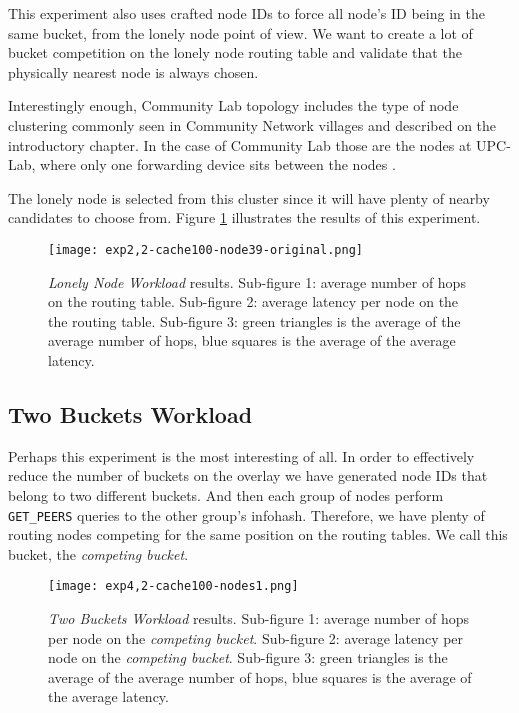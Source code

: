 \documentclass[conference]{IEEEtran}
\begin{document}
This experiment also uses crafted node IDs to force all node's ID being in the same bucket, from the lonely node point of view. We want to create a lot of bucket competition on the lonely node routing table and validate that the physically nearest node is always chosen.

Interestingly enough, Community Lab topology includes the type of node clustering commonly seen in Community Network villages and described on the introductory chapter. In the case of Community Lab those are the nodes at UPC-Lab, where only one forwarding device sits between the nodes \cite{b19}.

The lonely node is selected from this cluster since it will have plenty of nearby candidates to choose from. Figure \ref{fig:exp2,2-cache100-node39-original} illustrates the results of this experiment.

\begin{figure}
    \texttt{[image: exp2,2-cache100-node39-original.png]}
    \caption{\textit{Lonely Node Workload} results. Sub-figure 1: average number of hops on the routing table. Sub-figure 2: average latency per node on the the routing table. Sub-figure 3: green triangles is the average of the average number of hops, blue squares is the average of the average latency.}
    \label{fig:exp2,2-cache100-node39-original}
\end{figure}


\subsection{Two Buckets Workload}

Perhaps this experiment is the most interesting of all. In order to effectively reduce the number of buckets on the overlay we have generated node IDs that belong to two different buckets. And then each group of nodes perform \texttt{GET\_PEERS} queries to the other group's infohash. Therefore, we have plenty of routing nodes competing for the same position on the routing tables. We call this bucket, the \textit{competing bucket}.

\begin{figure}
    \texttt{[image: exp4,2-cache100-nodes1.png]}
    \caption{\textit{Two Buckets Workload} results. Sub-figure 1: average number of hops per node on the \textit{competing bucket}. Sub-figure 2: average latency per node on the \textit{competing bucket}. Sub-figure 3: green triangles is the average of the average number of hops, blue squares is the average of the average latency.}
    \label{fig:exp4,2-cache100-nodes1}
\end{figure}
\end{document}
